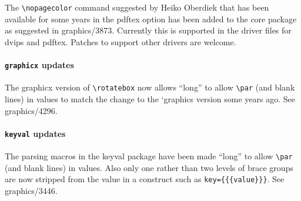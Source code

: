 \documentclass{ltnews}
\begin{document}
The \verb|\nopagecolor| command suggested by Heiko Oberdiek that has
been available for some years in the \textsf{pdftex} option has been
added to the core package as suggested in graphics/3873. Currently
this is supported in the driver files for \textsf{dvips} and
\textsf{pdftex}.  Patches to support other drivers are welcome.

 \paragraph{\texttt{graphicx} updates}

The \textsf{graphicx} version of \verb|\rotatebox| now allows ``long''
to allow \verb|\par| (and blank lines) in values to match the change
to the `\textsf{graphics} version some years ago. See graphics/4296.

\paragraph{\texttt{keyval} updates}

The parsing macros in the \textsf{keyval} package have been made
``long'' to allow \verb|\par| (and blank lines) in values. Also only
one rather than two levels of brace groups are now stripped from the
value in a construct such as \verb|key={{{value}}}|. See
graphics/3446.
\end{document}
